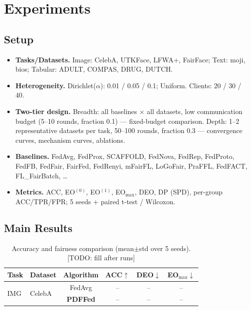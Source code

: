 \documentclass{article}
\begin{document}
\section{Experiments}
\label{sec:exp}
\subsection{Setup}
\begin{itemize}
  \item \textbf{Tasks/Datasets.} Image: CelebA, UTKFace, LFWA+, FairFace;
        Text: moji, bios; Tabular: ADULT, COMPAS, DRUG, DUTCH.
  \item \textbf{Heterogeneity.} Dirichlet($\alpha$): 0.01 / 0.05 / 0.1;
        Uniform. Clients: 20 / 30 / 40.
  \item \textbf{Two-tier design.}
        Breadth: all baselines $\times$ all datasets, low communication
        budget (5--10 rounds, fraction 0.1) --- fixed-budget comparison.
        Depth: 1--2 representative datasets per task, 50--100 rounds,
        fraction 0.3 --- convergence curves, mechanism curves, ablations.
  \item \textbf{Baselines.} FedAvg, FedProx, SCAFFOLD, FedNova, FedRep,
        FedProto, FedFB, FedFair, FairFed, FedRenyi, mFairFL, LoGoFair,
        PraFFL, FedFACT, FL\_FairBatch, \ldots
  \item \textbf{Metrics.} ACC, EO$^{(0)}$, EO$^{(1)}$, EO$_{\max}$, DEO,
        DP (SPD), per-group ACC/TPR/FPR; 5 seeds + paired t-test / Wilcoxon.
\end{itemize}

\subsection{Main Results}
\begin{table}[t]
\centering
\caption{Accuracy and fairness comparison (mean$\pm$std over 5 seeds).
[TODO: fill after runs]}\label{tab:main}
\begin{tabular}{llcccc}
\toprule
Task & Dataset & Algorithm & ACC$\uparrow$ & DEO$\downarrow$ & EO$_{\max}$$\downarrow$ \\
\midrule
\multirow{2}{*}{IMG} & \multirow{2}{*}{CelebA} & FedAvg & -- & -- & -- \\
 & & \textbf{PDFFed} & -- & -- & -- \\
\bottomrule
\end{tabular}
\end{table}
\end{document}
